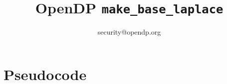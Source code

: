 

\title{OpenDP \texttt{make\_base\_laplace}}
\author{security@opendp.org}





\maketitle
\section{Pseudocode}
\label{sec:python-pseudocode}

\inputminted{python}{pseudocode.py}


